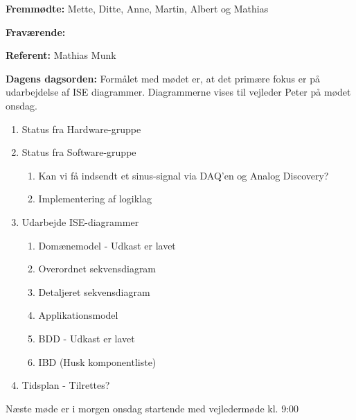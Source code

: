 \textbf{Fremmødte:} Mette, Ditte, Anne, Martin, Albert og Mathias 

\textbf{Fraværende:}

\textbf{Referent:} Mathias Munk

\textbf{Dagens dagsorden:}
\newline
Formålet med mødet er, at det primære fokus er på udarbejdelse af ISE diagrammer. Diagrammerne vises til vejleder Peter på mødet onsdag.
\begin{enumerate}
\item Status fra Hardware-gruppe

\item Status fra Software-gruppe
\begin{enumerate}
\item Kan vi få indsendt et sinus-signal via DAQ'en og Analog Discovery?
\item Implementering af logiklag
\end{enumerate}

\item Udarbejde ISE-diagrammer
\begin{enumerate}
\item Domænemodel - Udkast er lavet
\item Overordnet sekvensdiagram
\item Detaljeret sekvensdiagram
\item Applikationsmodel
\item BDD - Udkast er lavet
\item IBD (Husk komponentliste)
\end{enumerate}
\item Tidsplan - Tilrettes?
\end{enumerate}
Næste møde er i morgen onsdag startende med vejledermøde kl. 9:00


